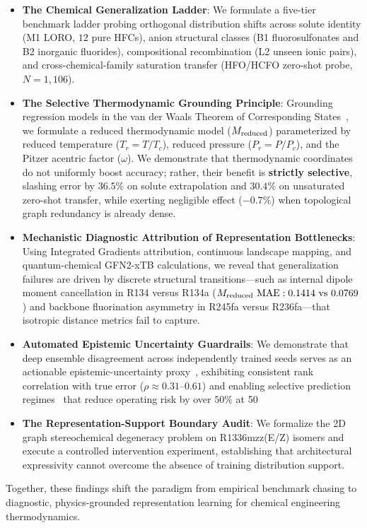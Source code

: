 \begin{itemize}
    \item \textbf{The Chemical Generalization Ladder}: We formulate a five-tier benchmark ladder probing orthogonal distribution shifts across solute identity (M1 LORO, $12$ pure HFCs), anion structural classes (B1 fluorosulfonates and B2 inorganic fluorides), compositional recombination (L2 unseen ionic pairs), and cross-chemical-family saturation transfer (HFO/HCFO zero-shot probe, $N=1,106$).
    
    \item \textbf{The Selective Thermodynamic Grounding Principle}: Grounding regression models in the van der Waals Theorem of Corresponding States~\cite{Pitzer1955_Acentric,Prausnitz1998_FluidPhase,Kocis2020_PINN_Thermo}, we formulate a reduced thermodynamic model ($M_{\rm reduced}$) parameterized by reduced temperature ($T_r = T/T_c$), reduced pressure ($P_r = P/P_c$), and the Pitzer acentric factor ($\omega$). We demonstrate that thermodynamic coordinates do not uniformly boost accuracy; rather, their benefit is \textbf{strictly selective}, slashing error by $36.5\%$ on solute extrapolation and $30.4\%$ on unsaturated zero-shot transfer, while exerting negligible effect ($-0.7\%$) when topological graph redundancy is already dense.
    
    \item \textbf{Mechanistic Diagnostic Attribution of Representation Bottlenecks}: Using Integrated Gradients attribution, continuous landscape mapping, and quantum-chemical GFN2-xTB calculations, we reveal that generalization failures are driven by discrete structural transitions---such as internal dipole moment cancellation in R134 versus R134a ($M_{\rm reduced}\text{ MAE}: 0.1414\text{ vs } 0.0769$) and backbone fluorination asymmetry in R245fa versus R236fa---that isotropic distance metrics fail to capture.
    
    \item \textbf{Automated Epistemic Uncertainty Guardrails}: We demonstrate that deep ensemble disagreement across independently trained seeds serves as an actionable epistemic-uncertainty proxy~\cite{Lakshminarayanan2017_DeepEnsembles}, exhibiting consistent rank correlation with true error ($\rho \approx 0.31\text{--}0.61$) and enabling selective prediction regimes~\cite{Geifman2017_SelectiveNet} that reduce operating risk by over $50\%$ at 50%
    
    \item \textbf{The Representation-Support Boundary Audit}: We formalize the 2D graph stereochemical degeneracy problem on R1336mzz(E/Z) isomers and execute a controlled intervention experiment, establishing that architectural expressivity cannot overcome the absence of training distribution support.
\end{itemize}

Together, these findings shift the paradigm from empirical benchmark chasing to diagnostic, physics-grounded representation learning for chemical engineering thermodynamics.
